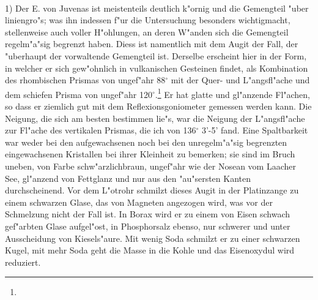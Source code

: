 \documentclass[a4paper, 11pt, oneside]{article}
\begin{document}
\paragraph{}
1) Der E. von Juvenas ist meistenteils deutlich k"ornig und die Gemengteil "uber liniengro"s; was ihn indessen f"ur die Untersuchung besonders wichtigmacht, stellenweise auch voller H"ohlungen‚ an deren W"anden sich die Gemengteil regelm"a"sig begrenzt haben. Diess ist namentlich mit dem Augit der Fall, der "uberhaupt der vorwaltende Gemengteil ist. Derselbe erscheint hier in der Form, in welcher er sich gew"ohnlich in vulkanischen Gesteinen findet, als Kombination des rhombischen Prismas von ungef"ahr 88$^{\circ}$ mit der Quer- und L"angsfl"ache und dem schiefen Prisma von ungef"ahr 120$^{\circ}$.\footnote{} Er hat glatte und gl"anzende Fl"achen, so dass er ziemlich gut mit dem Reflexionsgoniometer gemessen werden kann. Die Neigung, die sich am besten bestimmen lie"s, war die Neigung der L"angsfl"ache zur Fl"ache des vertikalen Prismas, die ich von 136$^{\circ}$ 3’-5’ fand. Eine Spaltbarkeit war weder bei den aufgewachsenen noch bei den unregelm"a"sig begrenzten eingewachsenen Kristallen bei ihrer Kleinheit zu bemerken; sie sind im Bruch uneben, von Farbe schw"arzlichbraun, ungef"ahr wie der Nosean vom Laacher See, gl"anzend von Fettglanz und nur aus den "au"sersten Kanten durchscheinend. Vor dem L"otrohr schmilzt dieses Augit in der Platinzange zu einem schwarzen Glase, das von Magneten angezogen wird, was vor der Schmelzung nicht der Fall ist. In Borax wird er zu einem von Eisen schwach gef"arbten Glase aufgel"ost, in Phosphorsalz ebenso, nur schwerer und unter Ausscheidung von Kiesels"aure. Mit wenig Soda schmilzt er zu einer schwarzen Kugel, mit mehr Soda geht die Masse in die Kohle und das Eisenoxydul wird reduziert.
\end{document}

